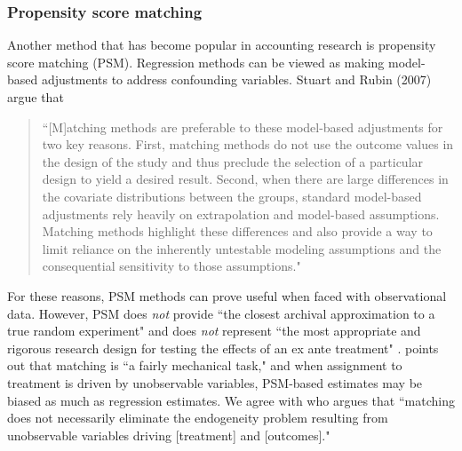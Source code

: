 \documentclass[12pt,reqno,titlepage]{amsart}
\begin{document}
\begin{doublespace}

\subsubsection{Propensity score matching}
Another method that has become popular in accounting research is propensity score matching (PSM).
Regression methods can be viewed as making model-based adjustments to address confounding variables.  
Stuart and Rubin (2007) argue that 

\begin{quote}\begin{singlespace} 
``[M]atching methods are preferable to these model-based adjustments for two key reasons. 
First, matching methods do not use the outcome values in the design of the study and thus preclude the selection of a particular design to yield a desired result.
Second, when there are large differences in the covariate distributions between the groups, standard model-based adjustments rely heavily on extrapolation and model-based assumptions.
Matching methods highlight these differences and also provide a way to limit reliance on the inherently untestable modeling assumptions and the consequential sensitivity to those assumptions."\end{singlespace} 
\end{quote}
For these reasons, PSM methods can prove useful when faced with observational data.
However, PSM does \emph{not} provide ``the closest archival approximation to a true random experiment" and does \emph{not} represent ``the most appropriate and rigorous research design for testing the effects of an ex ante treatment" \citep[p.\,1429]{Kirk:2014gx}.
\citet[pp.\,73-75]{Rosenbaum:2009ul} points out that matching is ``a fairly mechanical  task," and when assignment to treatment is driven by unobservable variables, PSM-based estimates may be biased as much as regression estimates.
We agree with \citet{MinuttiMeza:2014fn} who argues that ``matching does not necessarily eliminate the endogeneity problem resulting from unobservable variables driving [treatment] and [outcomes]."


\end{doublespace}
\end{document}
